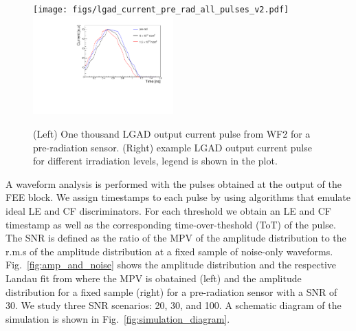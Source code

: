 \documentclass[preprint,1p]{elsarticle}
\begin{document}
 \begin{figure}[htbp]
   \centering
   \texttt{[image: figs/lgad\_current\_pre\_rad\_all\_pulses\_v2.pdf]} \hfill
   \includegraphics[width=0.48\textwidth]{figs/LGAD_current_all_irradiations_v2.pdf}
   \caption{(Left) One thousand LGAD output current pulse from WF2 for a pre-radiation sensor.
   (Right) example LGAD output current pulse for different irradiation levels, legend is shown in the plot.}
   \label{fig:lgad_current}
 \end{figure}


A waveform analysis is performed with the pulses obtained at the output of the
FEE block. We assign timestamps to each pulse by using algorithms that emulate
ideal LE and CF discriminators. For each threshold we obtain an LE and CF
timestamp as well as the corresponding time-over-theshold (ToT) of the pulse.
The SNR is defined as the ratio of the MPV of the amplitude distribution to the
r.m.s of the amplitude distribution at a fixed sample of noise-only waveforms.
Fig.~\ref{fig:amp_and_noise} shows the amplitude distribution and the respective Landau fit
from where the MPV is obatained (left) and the amplitude distribution for a fixed sample (right)
for a pre-radiation sensor with a SNR of 30.
We study three SNR scenarios: 20, 30, and 100. A schematic diagram of the
simulation is shown in Fig.~\ref{fig:simulation_diagram}.
\end{document}
